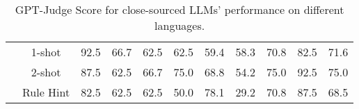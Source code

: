\documentclass[letterpaper]{article} %
\begin{document}
\begin{table*}[t]
{\begin{tabular}{lcccccccccc}
 & \cellcolor{darkpurple!25}1-shot & \cellcolor{lightpurple!25}92.5 & \cellcolor{lightpurple!25}66.7 & \cellcolor{lightpurple!25}62.5 & \cellcolor{lightpurple!25}62.5 & \cellcolor{lightpurple!25}59.4 & \cellcolor{lightpurple!25}58.3 & \cellcolor{lightpurple!25}70.8 & \cellcolor{lightpurple!25}82.5 & \cellcolor{darkpurple!25}71.6 \\
 & \cellcolor{darkpurple!25}2-shot & \cellcolor{lightpurple!25}87.5 & \cellcolor{lightpurple!25}62.5 & \cellcolor{lightpurple!25}66.7 & \cellcolor{lightpurple!25}75.0 & \cellcolor{lightpurple!25}68.8 & \cellcolor{lightpurple!25}54.2 & \cellcolor{lightpurple!25}75.0 & \cellcolor{lightpurple!25}92.5 & \cellcolor{darkpurple!25}75.0 \\
 & \cellcolor{darkpurple!25}Rule Hint & \cellcolor{lightpurple!25}82.5 & \cellcolor{lightpurple!25}62.5 & \cellcolor{lightpurple!25}62.5 & \cellcolor{lightpurple!25}50.0 & \cellcolor{lightpurple!25}78.1 & \cellcolor{lightpurple!25}29.2 & \cellcolor{lightpurple!25}70.8 & \cellcolor{lightpurple!25}87.5 & \cellcolor{darkpurple!25}68.5 \\
\bottomrule
\end{tabular}}
\caption{GPT-Judge Score for close-sourced LLMs' performance on different languages.}
\label{tab:api_on_language}
\vspace{-5mm}
\end{table*}
\end{document}
